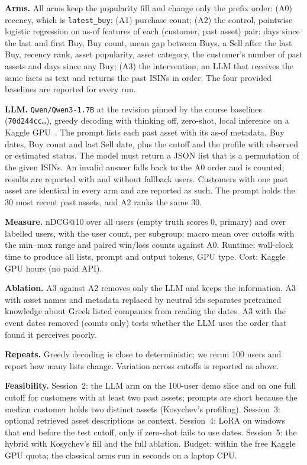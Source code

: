 \documentclass[conference]{IEEEtran}
\begin{document}
\textbf{Arms.} All arms keep the popularity fill and change only the prefix order: (A0) recency, which is \texttt{latest\_buy}; (A1) purchase count; (A2) the control, pointwise logistic regression on as-of features of each (customer, past asset) pair: days since the last and first Buy, Buy count, mean gap between Buys, a Sell after the last Buy, recency rank, asset popularity, asset category, the customer's number of past assets and days since any Buy; (A3) the intervention, an LLM that receives the same facts as text and returns the past ISINs in order. The four provided baselines are reported for every run.

\textbf{LLM.} \texttt{Qwen/Qwen3-1.7B} at the revision pinned by the course baselines (\texttt{70d244cc\ldots}), greedy decoding with thinking off, zero-shot, local inference on a Kaggle GPU~\cite{baselines}. The prompt lists each past asset with its as-of metadata, Buy dates, Buy count and last Sell date, plus the cutoff and the profile with observed or estimated status. The model must return a JSON list that is a permutation of the given ISINs. An invalid answer falls back to the A0 order and is counted; results are reported with and without fallback users. Customers with one past asset are identical in every arm and are reported as such. The prompt holds the 30 most recent past assets, and A2 ranks the same 30.

\textbf{Measure.} nDCG@10 over all users (empty truth scores 0, primary) and over labelled users, with the user count, per subgroup; macro mean over cutoffs with the min--max range and paired win/loss counts against A0. Runtime: wall-clock time to produce all lists, prompt and output tokens, GPU type. Cost: Kaggle GPU hours (no paid API).

\textbf{Ablation.} A3 against A2 removes only the LLM and keeps the information. A3 with asset names and metadata replaced by neutral ids separates pretrained knowledge about Greek listed companies from reading the dates. A3 with the event dates removed (counts only) tests whether the LLM uses the order that~\cite{llmrank} found it perceives poorly.

\textbf{Repeats.} Greedy decoding is close to deterministic; we rerun 100 users and report how many lists change. Variation across cutoffs is reported as above.

\textbf{Feasibility.} Session~2: the LLM arm on the 100-user demo slice and on one full cutoff for customers with at least two past assets; prompts are short because the median customer holds two distinct assets (Kosychev's profiling). Session~3: optional retrieved asset descriptions as context. Session~4: LoRA on windows that end before the test cutoff, only if zero-shot fails to use dates. Session~5: the hybrid with Kosychev's fill and the full ablation. Budget: within the free Kaggle GPU quota; the classical arms run in seconds on a laptop CPU.
\end{document}
